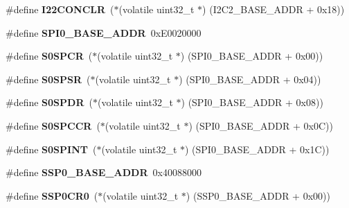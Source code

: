 \begin{DoxyCompactItemize}
\#define {\bfseries I22\+C\+O\+N\+C\+LR}~($\ast$(volatile uint32\+\_\+t $\ast$) (I2\+C2\+\_\+\+B\+A\+S\+E\+\_\+\+A\+D\+DR + 0x18))
\item 
\mbox{\label{group__lpc24xx__regs_gab01c0bf45f92131c444196eb762c49c0}} 
\#define {\bfseries S\+P\+I0\+\_\+\+B\+A\+S\+E\+\_\+\+A\+D\+DR}~0x\+E0020000
\item 
\mbox{\label{group__lpc24xx__regs_ga3ddecf939b21cd44d3ac4da904babd74}} 
\#define {\bfseries S0\+S\+P\+CR}~($\ast$(volatile uint32\+\_\+t $\ast$) (S\+P\+I0\+\_\+\+B\+A\+S\+E\+\_\+\+A\+D\+DR + 0x00))
\item 
\mbox{\label{group__lpc24xx__regs_ga0b0d1de79372d1c997a49481b33eb142}} 
\#define {\bfseries S0\+S\+P\+SR}~($\ast$(volatile uint32\+\_\+t $\ast$) (S\+P\+I0\+\_\+\+B\+A\+S\+E\+\_\+\+A\+D\+DR + 0x04))
\item 
\mbox{\label{group__lpc24xx__regs_gac1dcfdef505b8a51bfe8897d5f7cfea2}} 
\#define {\bfseries S0\+S\+P\+DR}~($\ast$(volatile uint32\+\_\+t $\ast$) (S\+P\+I0\+\_\+\+B\+A\+S\+E\+\_\+\+A\+D\+DR + 0x08))
\item 
\mbox{\label{group__lpc24xx__regs_ga042490d4a2ce295d0bc8c31bd56ce4c6}} 
\#define {\bfseries S0\+S\+P\+C\+CR}~($\ast$(volatile uint32\+\_\+t $\ast$) (S\+P\+I0\+\_\+\+B\+A\+S\+E\+\_\+\+A\+D\+DR + 0x0\+C))
\item 
\mbox{\label{group__lpc24xx__regs_gab9db240a5132df781fd0aa8d2b7972ee}} 
\#define {\bfseries S0\+S\+P\+I\+NT}~($\ast$(volatile uint32\+\_\+t $\ast$) (S\+P\+I0\+\_\+\+B\+A\+S\+E\+\_\+\+A\+D\+DR + 0x1\+C))
\item 
\mbox{\label{group__lpc24xx__regs_gae32072ca2d22139ef114673961671064}} 
\#define {\bfseries S\+S\+P0\+\_\+\+B\+A\+S\+E\+\_\+\+A\+D\+DR}~0x40088000
\item 
\mbox{\label{group__lpc24xx__regs_gacac3fbd962af29e483293f49f5a4d489}} 
\#define {\bfseries S\+S\+P0\+C\+R0}~($\ast$(volatile uint32\+\_\+t $\ast$) (S\+S\+P0\+\_\+\+B\+A\+S\+E\+\_\+\+A\+D\+DR + 0x00))
\item 

\end{DoxyCompactItemize}
